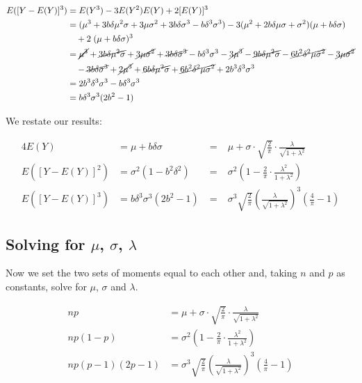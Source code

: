 \documentclass{article}
\begin{document}
\begin{align*}
  E([Y - E(Y)]^3) &= E(Y^3) - 3E(Y^2)E(Y) + 2[E(Y)]^3 \\
  &= (\mu^3 + 3 b \delta \mu^2 \sigma + 3 \mu \sigma^2 + 3 b \delta \sigma^3 - b \delta^3 \sigma^3) - 3 (\mu^2 + 2b \delta \mu \sigma + \sigma^2) (\mu + b \delta \sigma) \\
  & \quad + 2\;(\mu + b \delta \sigma)^3 \\
  &= \cancel{\mu^3} + \cancel{3 b \delta \mu^2 \sigma} + \cancel{3 \mu \sigma^2} + \cancel{3 b \delta \sigma^3} - b \delta^3 \sigma^3 - \cancel{3 \mu^3} - \cancel{9 b \delta \mu^2 \sigma} -
    \cancel{6 b^2 \delta^2 \mu \sigma^2} - \cancel{3 \mu \sigma^2} \\
  & \quad - \cancel{3 b \delta \sigma^3} + \cancel{2 \mu^3} + \cancel{6 b \delta \mu^2 \sigma} + \cancel{6 b^2 \delta^2 \mu \sigma^2} + 2 b^3 \delta^3 \sigma^3 \\
  &= 2 b^3 \delta^3 \sigma^3 - b \delta^3 \sigma^3 \\
  &= b \delta^3 \sigma^3 (2b^2 - 1)
\end{align*}

We restate our results:

\begin{alignat}{4}
  E(Y) &= \mu + b \delta \sigma \;&=&\; \mu + \sigma \cdot \sqrt{\frac{2}{\pi}} \cdot \frac{\lambda}{\sqrt{1 + \lambda^2}} \nonumber \\
  E([Y - E(Y)]^2) &= \sigma^2 (1 - b^2 \delta^2) \;&=&\; \sigma^2 \left( 1 - \frac{2}{\pi} \cdot \frac{\lambda^2}{1 + \lambda^2} \right) \\
  E([Y - E(Y)]^3) &= b \delta^3 \sigma^3 (2b^2 - 1) \;&=&\; \sigma^3 \sqrt{\frac{2}{\pi}} \left( \frac{\lambda}{\sqrt{1 + \lambda^2}} \right)^3 \left( \frac{4}{\pi} - 1 \right) \nonumber
\end{alignat}

\subsection{Solving for $\mu$, $\sigma$, $\lambda$}

Now we set the two sets of moments equal to each other and, taking $n$ and $p$
as constants, solve for $\mu$, $\sigma$ and $\lambda$.

\begin{subequations}
\begin{align}
  np &= \mu + \sigma \cdot \sqrt{\frac{2}{\pi}} \cdot \frac{\lambda}{\sqrt{1 + \lambda^2}} \label{eq:first-moment-set} \\
  np(1-p) &= \sigma^2 \left( 1 - \frac{2}{\pi} \cdot \frac{\lambda^2}{1 + \lambda^2} \right) \label{eq:second-moment-set} \\
  np(p-1)(2p-1) &= \sigma^3 \sqrt{\frac{2}{\pi}} \left( \frac{\lambda}{\sqrt{1 + \lambda^2}} \right)^3 \left( \frac{4}{\pi} - 1 \right) \label{eq:third-moment-set}
\end{align}
\end{subequations}
\end{document}
